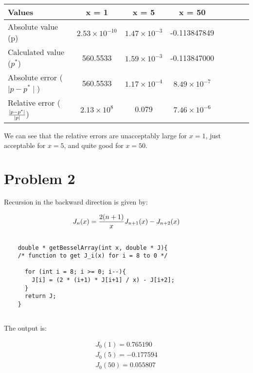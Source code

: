 \documentclass[12pt,letterpaper]{article}
\begin{document}
\begin{center}
\begin{tabular}{l*{6}{c}r}
\hline
Values 	            	& x = 1 & x = 5 & x = 50\\
\hline
Absolute value (p) 								& $2.53 \times 10^{-10}$ 	& $1.47 \times 10^{-3}$ 	& -0.113847849  \\
Calculated value ($p^*$)        						& 560.5533 				& $1.59	\times 10^{-3}$		& -0.113847000 \\
Absolute error ($\mid p - p^* \mid$)          				& 560.5533				& $1.17 \times 10^{-4}$		& $8.49 \times 10^{-7}$ \\
\hline
Relative error ($\mid p - p^* \mid \over \mid p \mid$)    	& $2.13 \times 10^8$ 		& 0.079					& $7.46 \times 10^{-6}$ \\
\hline
\end{tabular}
\end{center}


We can see that the relative errors are unacceptably large for $x = 1$, just acceptable for $x = 5$, and quite good for $x = 50$.

\newpage

\section*{Problem 2}

Recursion in the backward direction is given by:

\begin{equation*}
	J_n(x) = {2(n+1)\over{x}}  J_{n+1}(x) - J_{n+2}(x) \\
\end{equation*}

    
    \lstset{language=C++}
    \begin{lstlisting}[style = C]
	
	double * getBesselArray(int x, double * J){
	/* function to get J_i(x) for i = 8 to 0 */

	  for (int i = 8; i >= 0; i--){
	    J[i] = (2 * (i+1) * J[i+1] / x) - J[i+2];
	  }
	  return J;
	}
	

    \end{lstlisting}

The output is:

\begin{align}
J_{0}(1) = 0.765190 \\
J_{0}(5) = -0.177594 \\
J_{0}(50) = 0.055807
\end{align}
\end{document}
